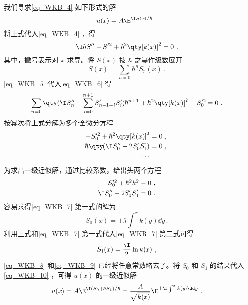 我们寻求\autoref{eq_WKB_4} 如下形式的解
\begin{equation}\label{eq_WKB_10}
u(x)=A\E^{\I S(x)/\hbar}~.
\end{equation}
将上式代入\autoref{eq_WKB_4} ，得
\begin{equation}\label{eq_WKB_6}
\I\hbar S''-S'^2+\hbar^2\qty[k(x)]^2=0~.
\end{equation}
其中，撇号表示对 $x$ 求导。将 $S(x)$ 按 $\hbar$ 之幂作级数展开
\begin{equation}\label{eq_WKB_5}
S(x)=\sum_{n=0}\hbar^nS_n(x)~.
\end{equation}
\autoref{eq_WKB_5} 代入\autoref{eq_WKB_6} 得
\begin{equation}
\sum_{n=0}\qty(\I S_n''-\sum_{i=0}^{n+1}S_{n+1-i}'S_i')\hbar^{n+1}+\hbar^2\qty[k(x)]^2-S_0'^2=0~.
\end{equation}
按幂次将上式分解为多个全微分方程
\begin{equation}
\begin{aligned}
-S_0'^2+\hbar^2\qty[k(x)]^2&=0~,\\
\hbar\qty(\I S_0''-2S_0'S_1')&=0~,\\
\cdots
\end{aligned}~
\end{equation}
为求出一级近似解，通过比较系数，给出头两个方程
\begin{equation}\label{eq_WKB_7}
\begin{aligned}
-S_0'^2+\hbar^2k^2=0~,\\
\I S_0''-2S_0'S_1'=0~.
\end{aligned}
\end{equation}
容易求得\autoref{eq_WKB_7} 第一式的解为
\begin{equation}\label{eq_WKB_8}
S_0(x)=\pm\hbar\int^x k(y)\dd y~.
\end{equation}
利用上式和\autoref{eq_WKB_7} 第一式代入\autoref{eq_WKB_7} 第二式可得
\begin{equation}\label{eq_WKB_9}
S_1(x)=\frac{\I}{2}\ln k(x)~,
\end{equation}
\autoref{eq_WKB_8} 和\autoref{eq_WKB_9} 已经将任意常数略去了。将 $S_0$ 和 $S_1$ 的结果代入\autoref{eq_WKB_10} ，可得 $u(x)$ 的一级近似解
\begin{equation}\label{eq_WKB_11}
u(x)=A\E^{\I(S_0+\hbar S_1)/\hbar}=\frac{A}{\sqrt{k(x)}} \E^{\pm\I\int^x k(y)\dd y}~.
\end{equation}

